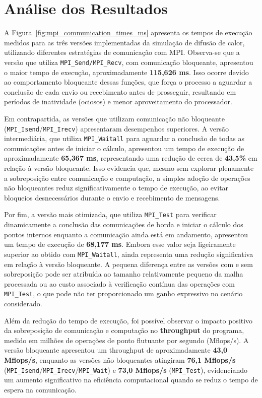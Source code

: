 \documentclass[a4paper, 12pt]{article}
\begin{document}
	\section{Análise dos Resultados}
	
	\hspace{0.62cm}A Figura~\ref{fig:mpi_communication_times_ms} apresenta os tempos de execução medidos para as três versões implementadas da simulação de difusão de calor, utilizando diferentes estratégias de comunicação com MPI. Observa-se que a versão que utiliza \texttt{MPI\_Send/MPI\_Recv}, com comunicação bloqueante, apresentou o maior tempo de execução, aproximadamente \textbf{115,626 ms}. Isso ocorre devido ao comportamento bloqueante dessas funções, que força o processo a aguardar a conclusão de cada envio ou recebimento antes de prosseguir, resultando em períodos de inatividade (ociosos) e menor aproveitamento do processador.
	
	Em contrapartida, as versões que utilizam comunicação não bloqueante (\texttt{MPI\_Isend}/\texttt{MPI\_Irecv}) apresentaram desempenhos superiores. A versão intermediária, que utiliza \texttt{MPI\_Waitall} para aguardar a conclusão de todas as comunicações antes de iniciar o cálculo, apresentou um tempo de execução de aproximadamente \textbf{65,367 ms}, representando uma redução de cerca de \textbf{43,5\%} em relação à versão bloqueante. Isso evidencia que, mesmo sem explorar plenamente a sobreposição entre comunicação e computação, a simples adoção de operações não bloqueantes reduz significativamente o tempo de execução, ao evitar bloqueios desnecessários durante o envio e recebimento de mensagens.
	
	Por fim, a versão mais otimizada, que utiliza \texttt{MPI\_Test} para verificar dinamicamente a conclusão das comunicações de borda e iniciar o cálculo dos pontos internos enquanto a comunicação ainda está em andamento, apresentou um tempo de execução de \textbf{68,177 ms}. Embora esse valor seja ligeiramente superior ao obtido com \texttt{MPI\_Waitall}, ainda representa uma redução significativa em relação à versão bloqueante. A pequena diferença entre as versões com e sem sobreposição pode ser atribuída ao tamanho relativamente pequeno da malha processada ou ao custo associado à verificação contínua das operações com \texttt{MPI\_Test}, o que pode não ter proporcionado um ganho expressivo no cenário considerado.
	
	Além da redução do tempo de execução, foi possível observar o impacto positivo da sobreposição de comunicação e computação no \textbf{throughput} do programa, medido em milhões de operações de ponto flutuante por segundo (Mflops/s). A versão bloqueante apresentou um throughput de aproximadamente \textbf{43,0 Mflops/s}, enquanto as versões não bloqueantes atingiram \textbf{76,1 Mflops/s} (\texttt{MPI\_Isend}/\texttt{MPI\_Irecv}/\texttt{MPI\_Wait}) e \textbf{73,0 Mflops/s} (\texttt{MPI\_Test}), evidenciando um aumento significativo na eficiência computacional quando se reduz o tempo de espera na comunicação.
	
\end{document}
